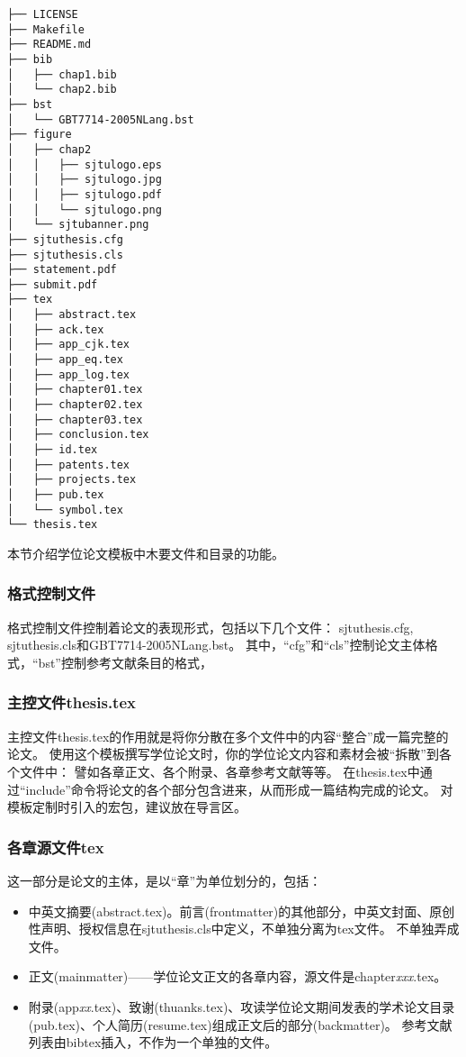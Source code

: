 \begin{lstlisting}[basicstyle=\small\ttfamily,caption={模板文件布局},label=layout,float,numbers=none]
├── LICENSE
├── Makefile
├── README.md
├── bib
│   ├── chap1.bib
│   └── chap2.bib
├── bst
│   └── GBT7714-2005NLang.bst
├── figure
│   ├── chap2
│   │   ├── sjtulogo.eps
│   │   ├── sjtulogo.jpg
│   │   ├── sjtulogo.pdf
│   │   └── sjtulogo.png
│   └── sjtubanner.png
├── sjtuthesis.cfg
├── sjtuthesis.cls
├── statement.pdf
├── submit.pdf
├── tex
│   ├── abstract.tex
│   ├── ack.tex
│   ├── app_cjk.tex
│   ├── app_eq.tex
│   ├── app_log.tex
│   ├── chapter01.tex
│   ├── chapter02.tex
│   ├── chapter03.tex
│   ├── conclusion.tex
│   ├── id.tex
│   ├── patents.tex
│   ├── projects.tex
│   ├── pub.tex
│   └── symbol.tex
└── thesis.tex
\end{lstlisting}

本节介绍学位论文模板中木要文件和目录的功能。

\subsubsection{格式控制文件}
\label{sec:format}

格式控制文件控制着论文的表现形式，包括以下几个文件：
sjtuthesis.cfg, sjtuthesis.cls和GBT7714-2005NLang.bst。
其中，“cfg”和“cls”控制论文主体格式，“bst”控制参考文献条目的格式，

\subsubsection{主控文件thesis.tex}
\label{sec:thesistex}

主控文件thesis.tex的作用就是将你分散在多个文件中的内容“整合”成一篇完整的论文。
使用这个模板撰写学位论文时，你的学位论文内容和素材会被“拆散”到各个文件中：
譬如各章正文、各个附录、各章参考文献等等。
在thesis.tex中通过“include”命令将论文的各个部分包含进来，从而形成一篇结构完成的论文。
对模板定制时引入的宏包，建议放在导言区。

\subsubsection{各章源文件tex}
\label{sec:thesisbody}

这一部分是论文的主体，是以“章”为单位划分的，包括：

\begin{itemize}[noitemsep,topsep=0pt,parsep=0pt,partopsep=0pt]
	\item 中英文摘要(abstract.tex)。前言(frontmatter)的其他部分，中英文封面、原创性声明、授权信息在sjtuthesis.cls中定义，不单独分离为tex文件。
不单独弄成文件。
	\item 正文(mainmatter)——学位论文正文的各章内容，源文件是chapter\emph{xxx}.tex。
	\item 附录(app\emph{xx}.tex)、致谢(thuanks.tex)、攻读学位论文期间发表的学术论文目录(pub.tex)、个人简历(resume.tex)组成正文后的部分(backmatter)。
参考文献列表由bibtex插入，不作为一个单独的文件。
\end{itemize}

